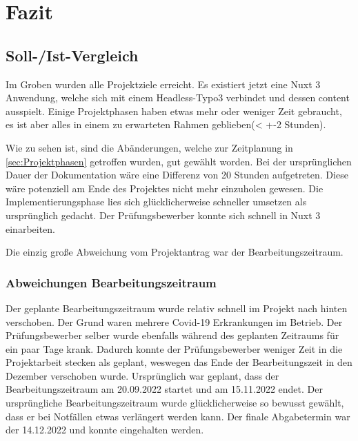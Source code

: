 \section{Fazit} 
\label{sec:Fazit}

\subsection{Soll-/Ist-Vergleich}
\label{sec:SollIstVergleich}

Im Groben wurden alle Projektziele erreicht. Es existiert jetzt eine Nuxt 3 Anwendung, welche sich mit einem Headless-Typo3 verbindet und dessen content ausspielt. Einige Projektphasen haben etwas mehr oder weniger Zeit gebraucht, es ist aber alles in einem zu erwarteten Rahmen geblieben(< +-2 Stunden).


Wie zu sehen ist, sind die Abänderungen, welche zur Zeitplanung in \ref{sec:Projektphasen} getroffen wurden, gut gewählt worden. Bei der ursprünglichen Dauer der Dokumentation wäre eine Differenz von 20 Stunden aufgetreten. Diese wäre potenziell am Ende des Projektes nicht mehr einzuholen gewesen. Die Implementierungsphase lies sich glücklicherweise schneller umsetzen als ursprünglich gedacht. Der Prüfungsbewerber konnte sich schnell in Nuxt 3 einarbeiten.

Die einzig große Abweichung vom Projektantrag war der Bearbeitungszeitraum.



\subsubsection{Abweichungen Bearbeitungszeitraum}
\label{sec:AbweichungenProjektantrag}
Der geplante Bearbeitungszeitraum wurde relativ schnell im Projekt nach hinten verschoben. Der Grund waren mehrere Covid-19 Erkrankungen im Betrieb. Der Prüfungsbewerber selber wurde ebenfalls während des geplanten Zeitraums für ein paar Tage krank. Dadurch konnte der Prüfungsbewerber weniger Zeit in die Projektarbeit stecken als geplant, weswegen das Ende der Bearbeitungszeit in den Dezember verschoben wurde. Ursprünglich war geplant, dass der Bearbeitungszeitraum am 20.09.2022 startet und am 15.11.2022 endet. Der ursprüngliche Bearbeitungszeitraum wurde glücklicherweise so bewusst gewählt, dass er bei Notfällen etwas verlängert werden kann. Der finale Abgabetermin war der 14.12.2022 und konnte eingehalten werden.

